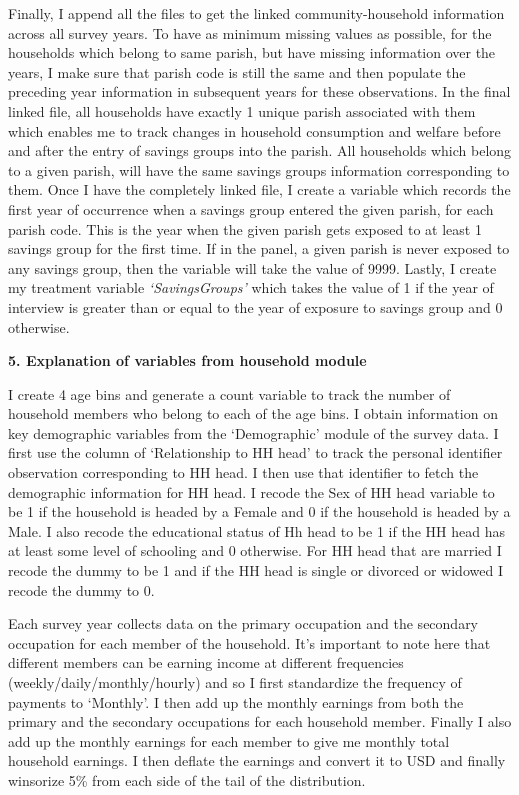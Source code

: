 \documentclass[12pt]{article}
\begin{document}
{{\hspace{1cm} Finally, I append all the files to get the linked community-household information across all survey years. To have as minimum missing values as possible, for the households which belong to same parish, but have missing information over the years, I make sure that parish code is still the same and then populate the preceding year information in subsequent years for these observations. In the final linked file, all households have exactly 1 unique parish associated with them which enables me to track changes in household consumption and welfare before and after the entry of savings groups into the parish. All households which belong to a given parish, will have the same savings groups information corresponding to them. Once I have the completely linked file, I create a variable which records the first year of occurrence when a savings group entered the given parish, for each parish code. This is the year when the given parish gets exposed to at least 1 savings group for the first time. If in the panel, a given parish is never exposed to any savings group, then the variable will take the value of 9999. Lastly, I create my treatment variable \textit{`SavingsGroups'} which takes the value of 1 if the year of interview is greater than or equal to the year of exposure to savings group and 0 otherwise. 

\vspace{1cm}

\textbf{ 5. Explanation of variables from household module}

\hspace{1cm}  I create 4 age bins and generate a count variable to track the number of household members who belong to each of the age bins. I obtain information on key demographic variables from the `Demographic' module of the survey data. I first use the column of `Relationship to HH head' to track the personal identifier observation corresponding to HH head. I then use that identifier to fetch the demographic information for HH head. I recode the Sex of HH head variable to be 1 if the household is headed by a Female and 0 if the household is headed by a Male. I also recode the educational status of Hh head to be 1 if the HH head has at least some level of schooling and 0 otherwise. For HH head that are married I recode the dummy to be 1 and if the HH head is single or divorced or widowed I recode the dummy to 0.

\hspace{1cm} Each survey year collects data on the primary occupation and the secondary occupation for each member of the household. It's important to note here that different members can be earning income at different frequencies (weekly/daily/monthly/hourly) and so I first standardize the frequency of payments to `Monthly'. I then add up the monthly earnings from both the primary and the secondary occupations for each household member. Finally I also add up the monthly earnings for each member to give me monthly total household earnings. I then deflate the earnings and convert it to USD and finally winsorize 5\% from each side of the tail of the distribution.

}}
\end{document}
